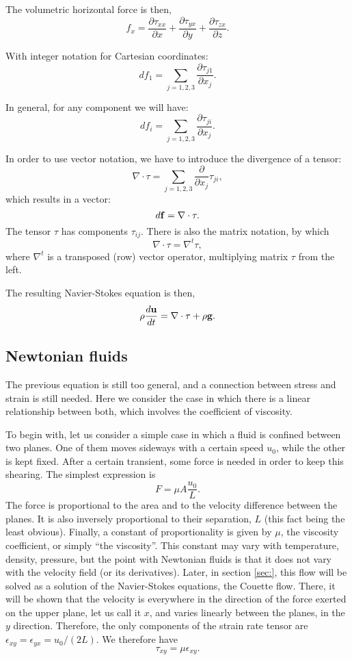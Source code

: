 The volumetric horizontal force is then,
\[
f_x  =
 \frac{\partial\tau_{xx}}{\partial x}
+\frac{\partial\tau_{yx}}{\partial y}
+\frac{\partial\tau_{zx}}{\partial z} .
\]

With integer notation for Cartesian coordinates:
\[
 df_1  =
 \sum_{j=1,2,3}
 \frac{\partial\tau_{j1}}{\partial x_j} .
\]


In general, for any component we will have:
\[
 df_i  =
 \sum_{j=1,2,3}
  \frac{\partial\tau_{ji}}{\partial x_j} .
\]

In order to use vector notation, we have to introduce the
divergence of a tensor:
\[
\nabla \cdot \tau = \sum_{j=1,2,3}
  \frac{\partial}{\partial x_j}  \tau_{ji} ,
\]
 which results in a vector:
\[
 d\mathbf{f}  =
 \nabla \cdot \tau .
\]
%
The tensor $\tau$ has components $\tau_{ij}$. There is also
the matrix notation, by which
\[
\nabla \cdot \tau = \nabla^t  \tau ,
\]
where $\nabla^t$ is a transposed (row) vector operator, multiplying
matrix $\tau$ from the left.

The resulting Navier-Stokes equation is then,
\[
\rho \frac{d\mathbf{u} }{dt} = \nabla \cdot \tau   + \rho \mathbf{g} .
\]



\subsection{Newtonian fluids}

The previous equation is still too general, and a connection between
stress and strain is still needed. Here we consider the case in which
there is a linear relationship between both, which involves the
coefficient of viscosity.

To begin with, let us consider a simple case in which a fluid is
confined between two planes. One of them moves sideways with a certain
speed $u_0$, while the other is kept fixed. After a certain transient,
some force is needed in order to keep this shearing. The simplest
expression is
\[
F= \mu A \frac{u_0}{L} .
\]
The force is proportional to the area and to the velocity difference
between the planes. It is also inversely proportional to their
separation, $L$ (this fact being the least obvious). Finally, a
constant of proportionality is given by $\mu$, the viscosity
coefficient, or simply ``the viscosity''. This constant may vary with
temperature, density, pressure, but the point with Newtonian fluids is
that it does not vary with the velocity field (or its
derivatives). Later, in section \ref{sec:}, this flow will be solved
as a solution of the Navier-Stokes equations, the Couette flow. There,
it will be shown that the velocity is everywhere in the direction of
the force exerted on the upper plane, let us call it $x$, and varies
linearly between the planes, in the $y$ direction. Therefore, the only
components of the strain rate tensor are $\epsilon_{xy} =
\epsilon_{yx} = u_0 / ( 2 L )$. We therefore have
\[
\tau_{xy} = \mu  \epsilon_{xy} .
\]


